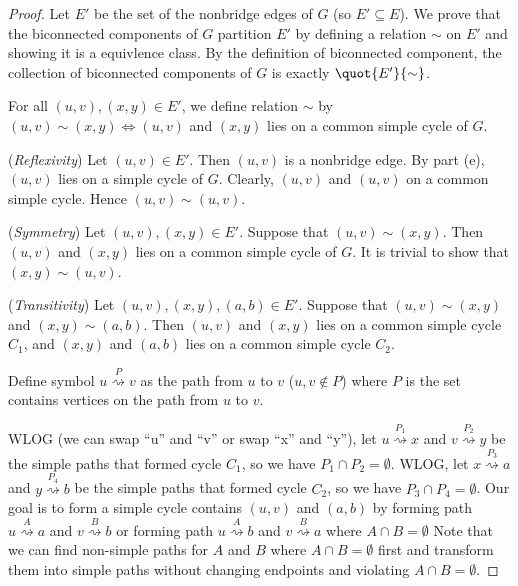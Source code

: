 \begin{proof}
    Let $E'$ be the set of the nonbridge edges of $G$ (so $E' \subseteq E$).
    We prove that the biconnected components of $G$ partition $E'$
    by defining a relation $\sim$ on $E'$ and showing it is a equivlence class.
    By the definition of biconnected component,
    the collection of biconnected components of $G$
    is exactly $\quot{E'}{\sim}$.

    For all $(u,v), (x,y) \in E'$, we define relation $\sim$ by 
    $(u,v) \sim (x,y) \Longleftrightarrow (u,v)$ and $(x,y)$
    lies on a common simple cycle of $G$.
    
    (\textit{Reflexivity})
    Let $(u,v) \in E'$.
    Then $(u,v)$ is a nonbridge edge.
    By part (e), $(u,v)$ lies on a simple cycle of $G$.
    Clearly, $(u,v)$ and $(u,v)$ on a common simple cycle.
    Hence $(u,v) \sim (u,v)$.

    (\textit{Symmetry})
    Let $(u,v), (x,y) \in E'$.
    Suppose that $(u,v) \sim (x,y)$.
    Then $(u,v)$ and $(x,y)$ lies on a common simple cycle of $G$.
    It is trivial to show that $(x,y) \sim (u,v)$.

    (\textit{Transitivity})
    Let $(u,v), (x,y), (a,b) \in E'$.
    Suppose that $(u,v) \sim (x,y)$ and $(x,y) \sim (a,b)$.
    Then $(u,v)$ and $(x,y)$ lies on a common simple cycle $C_1$,
    and $(x,y)$ and $(a,b)$ lies on a common simple cycle $C_2$.

    Define symbol
    $u \overset{P}{\rightsquigarrow} v$
    as the path from $u$ to $v$ ($u,v \notin P$)
    where $P$ is the set contains vertices on the path from $u$ to $v$.

    WLOG (we can swap ``u'' and ``v'' or swap ``x'' and ``y''), 
    let $u \overset{P_1}{\rightsquigarrow} x$ 
    and $v \overset{P_2}{\rightsquigarrow} y$ be the simple paths
    that formed cycle $C_1$, so we have $P_1 \cap P_2 = \emptyset$.
    WLOG, let $x \overset{P_3}{\rightsquigarrow} a$ 
    and $y \overset{P_4}{\rightsquigarrow} b$ be the simple paths
    that formed cycle $C_2$, so we have $P_3 \cap P_4 = \emptyset$.
    Our goal is to form a simple cycle contains $(u,v)$ and $(a,b)$
    by forming path $u \overset{A}{\rightsquigarrow} a$
    and $v \overset{B}{\rightsquigarrow} b$
    or forming path $u \overset{A}{\rightsquigarrow} b$
    and $v \overset{B}{\rightsquigarrow} a$
    where $A \cap B = \emptyset$
    Note that we can find non-simple paths 
    for $A$ and $B$
    where $A \cap B = \emptyset$ first
    and transform them into simple paths 
    without changing endpoints and 
    violating $A \cap B = \emptyset$.


\end{proof}
